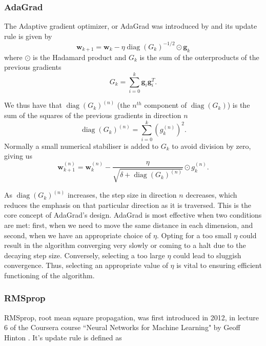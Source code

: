 \documentclass{article}
\theoremstyle{definition}
\DeclareMathOperator*{\diag}{diag}
\begin{document}
\subsubsection{AdaGrad}
The Adaptive gradient optimizer, or AdaGrad was introduced by \textcite{duchi2011adaptive} and its update rule is given by
\begin{equation*}
    \boldsymbol{w}_{k+1} = \boldsymbol{w}_{k} - \eta \diag\left( G_{k} \right)^{-1/2} \odot \boldsymbol{g}_k
\end{equation*}
where $\odot$ is the Hadamard product and $G_k$ is the sum of the outerproducts of the previous gradients
\begin{equation*}
    G_k = \sum_{i = 0}^k \boldsymbol{g}_i \boldsymbol{g}_i^T.
\end{equation*}

We thus have that $\diag\left(G_{k}\right)^{(n)}$ (the $n^{th}$ component of $\diag\left(G_k\right)$) is the sum of the squares of the previous gradients in direction $n$
\begin{equation*}
    \diag\left(G_{k}\right)^{(n)} = \sum_{i=0}^k  \left(g_k^{(n)}\right)^2 .
\end{equation*}
Normally a small numerical stabiliser is added to $G_k$ to avoid division by zero, giving us
\begin{equation*}
    \boldsymbol{w}_{k+1}^{(n)}= \boldsymbol{w}_{k}^{(n)}- \frac{\eta}{\sqrt{\delta + \diag \left( G_{k} \right)^{(n)}}} \odot g_k^{(n)}.
\end{equation*}

As $\diag\left(G_k\right)^{(n)}$ increases, the step size in direction $n$ decreases, which reduces the emphasis on that particular direction as it is traversed. This is the core concept of AdaGrad's design. AdaGrad is most effective when two conditions are met: first, when we need to move the same distance in each dimension, and second, when we have an appropriate choice of $\eta$. Opting for a too small $\eta$ could result in the algorithm converging very slowly or coming to a halt due to the decaying step size. Conversely, selecting a too large $\eta$ could lead to sluggish convergence. Thus, selecting an appropriate value of $\eta$ is vital to ensuring efficient functioning of the algorithm. 

\subsubsection{RMSprop}
RMSprop, root mean square propagation, was first introduced in 2012, in lecture 6 of the Coursera course ``Neural Networks for Machine Learning" by Geoff Hinton
\parencite{NNforML-Lecture6}. It's update rule is defined as 
\end{document}
